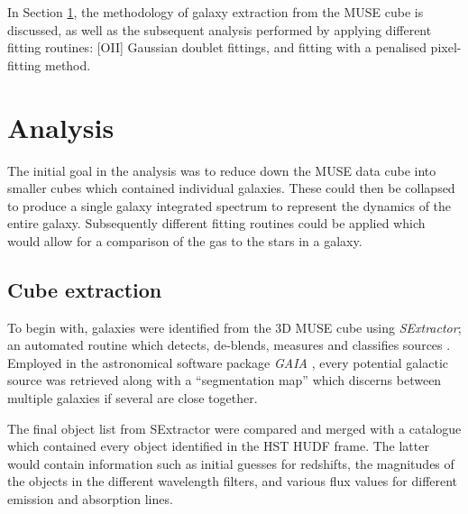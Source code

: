 \documentclass[12pt, twocolumn]{revtex4}    %
\begin{document}
In Section \ref{sec:analysis}, the methodology of galaxy extraction from the MUSE cube is discussed, as well as the subsequent analysis performed by applying different fitting routines: [OII] Gaussian doublet fittings, and fitting with a penalised pixel-fitting method. 



\section{Analysis} 
\label{sec:analysis}

The initial goal in the analysis was to reduce down the MUSE data cube into smaller cubes which contained individual galaxies. These could then be collapsed to produce a single galaxy integrated spectrum to represent the dynamics of the entire galaxy. Subsequently different fitting routines could be applied which would allow for a comparison of the gas to the stars in a galaxy.

\subsection{Cube extraction}

To begin with, galaxies were identified from the 3D MUSE cube using \textit{SExtractor}; an automated routine which detects, de-blends, measures and classifies sources \citep{bertin_sextractor}. Employed in the astronomical software package \textit{GAIA} \citep{currie_starlink}, every potential galactic source was retrieved along with a ``segmentation map'' which discerns between multiple galaxies if several are close together. 

The final object list from SExtractor were compared and merged with a catalogue which contained every object identified in the HST HUDF frame. The latter would contain information such as initial guesses for redshifts, the magnitudes of the objects in the different wavelength filters, and various flux values for different emission and absorption lines.
\end{document}
